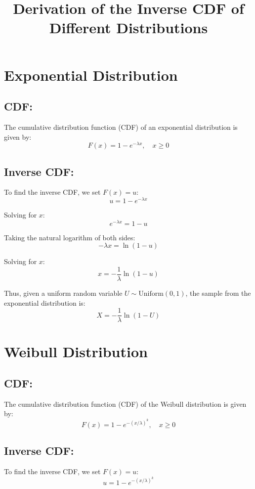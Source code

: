 \documentclass{article}
\begin{document}
\title{Derivation of the Inverse CDF of Different Distributions}
\author{}
\date{}
\maketitle

\section*{Exponential Distribution}

\subsection*{CDF:}
The cumulative distribution function (CDF) of an exponential distribution is given by:
\[
F(x) = 1 - e^{-\lambda x}, \quad x \geq 0
\]

\subsection*{Inverse CDF:}
To find the inverse CDF, we set \( F(x) = u \):
\[
u = 1 - e^{-\lambda x}
\]

Solving for \( x \):
\[
e^{-\lambda x} = 1 - u
\]

Taking the natural logarithm of both sides:
\[
-\lambda x = \ln(1 - u)
\]

Solving for \( x \):
\[
x = -\frac{1}{\lambda} \ln(1 - u)
\]

Thus, given a uniform random variable \( U \sim \text{Uniform}(0, 1) \), the sample from the exponential distribution is:
\[
X = -\frac{1}{\lambda} \ln(1 - U)
\]

\newpage

\section*{Weibull Distribution}

\subsection*{CDF:}
The cumulative distribution function (CDF) of the Weibull distribution is given by:
\[
F(x) = 1 - e^{-(x/\lambda)^k}, \quad x \geq 0
\]

\subsection*{Inverse CDF:}
To find the inverse CDF, we set \( F(x) = u \):
\[
u = 1 - e^{-(x/\lambda)^k}
\]
\end{document}
